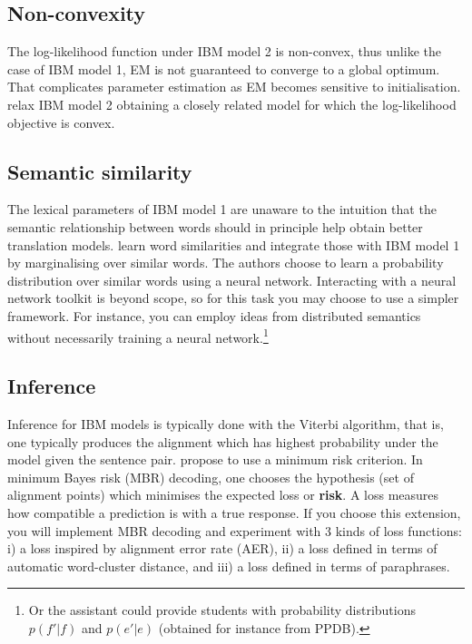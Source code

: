 \subsection*{Non-convexity}

The log-likelihood function under IBM model 2 is non-convex, thus unlike the case of IBM model 1, EM is not guaranteed to converge to a global optimum.
That complicates parameter estimation as EM becomes sensitive to initialisation.
\cite{Simion+2013:IBM2} relax IBM model 2 obtaining a closely related model for which the log-likelihood objective is convex. %

\subsection*{Semantic similarity}


The lexical parameters of IBM model 1 are unaware to the intuition that the semantic relationship between words should in principle help obtain better translation models.
\cite{Songyot+2014:WAWS} learn word similarities and integrate those with IBM model 1 by marginalising over similar words.
The authors choose to learn a probability distribution over similar words using a neural network.
Interacting with a neural network toolkit is beyond scope, so for this task you may choose to use a simpler framework. 
For instance, you can employ ideas from distributed semantics without necessarily training a neural network.\footnote{Or the assistant could provide students with probability distributions $p(f'|f)$ and $p(e'|e)$ (obtained for instance from PPDB).}

\subsection*{Inference}

Inference for IBM models is typically done with the Viterbi algorithm, that is, one typically produces the alignment which has highest probability under the model given the sentence pair.
\citet{Kumar+2002:MBRWA} propose to use a minimum risk criterion. 
In minimum Bayes risk (MBR) decoding, one chooses the hypothesis (set of alignment points) which minimises the expected loss or {\bf risk}.
A loss measures how compatible a prediction is with a true response.
If you choose this extension, you will implement MBR decoding and experiment with 3 kinds of loss functions: i) a loss inspired by alignment error rate (AER), ii) a loss defined in terms of automatic word-cluster distance, and iii) a loss defined in terms of paraphrases. 
